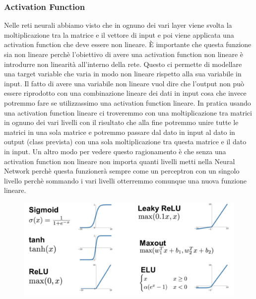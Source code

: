 \documentclass[14pt]{extreport}
\begin{document}
\subsubsection{Activation Function}

Nelle reti neurali abbiamo visto che in ognuno dei vari layer viene svolta la moltiplicazione tra la matrice e il vettore di input e poi viene
applicata una activation function che deve essere non lineare. È importante che questa funzione sia non lineare perchè l'obiettivo di avere una
activation function non lineare è introdurre non linearità all'interno della rete. Questo ci permette di modellare una target variable che varia in
modo non lineare rispetto alla sua variabile in input. Il fatto di avere una variabile non lineare vuol dire che l'output non può essere riprodotto
con una combinazione lineare dei dati in input cosa che invece potremmo fare se utilizzassimo una activation function lineare. In pratica usando una
activation function lineare ci troveremmo con una moltiplicazione tra matrici in ognuno dei vari livelli con il risultato che alla fine potremmo unire
tutte le matrici in una sola matrice e potremmo passare dal dato in input al dato in output (class prevista) con una sola moltiplicazione tra questa
matrice e il dato in input. Un altro modo per vedere questo ragionamento è che senza una activation function non lineare non importa quanti livelli
metti nella Neural Network perchè questa funzionerà sempre come un perceptron con un singolo livello perchè sommando i vari livelli otterremmo
comunque una nuova funzione lineare.

\begin{figure}[H]
\centering
\includegraphics[width=0.7\linewidth]{371.jpeg}
\end{figure}
\end{document}
